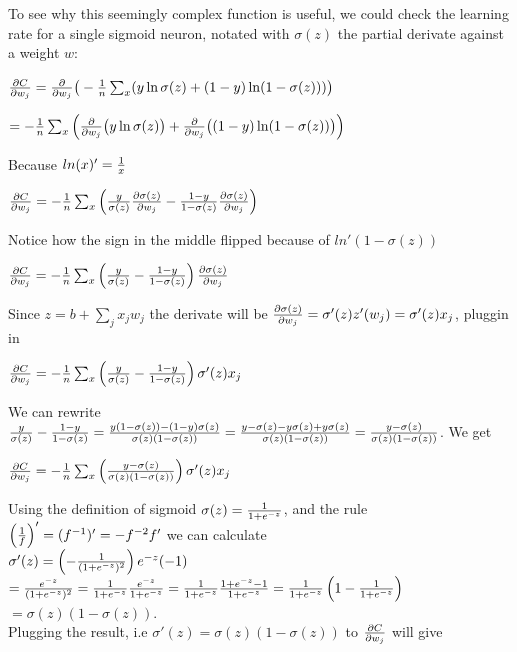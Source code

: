 To see why this seemingly complex function is useful, we could check the learning rate for a single sigmoid neuron, notated with \(\sigma(z)\) the partial derivate against a weight \(w\):

\({\partial C \over \partial w_j} = {\partial \over \partial w_j }{\big ( -{1 \over n}\sum_x(y \ln \sigma(z) + (1 - y) \ln (1-\sigma(z)))\big ) }\)

\(= -{1 \over n}\sum_x \left ( {\partial \over \partial w_j}\big ( y \ln \sigma(z)\big ) + {\partial \over \partial w_j} \big ((1 - y) \ln (1-\sigma(z))\big )\right )\)

Because \(ln(x)' = {1 \over x}\)

\({\partial C \over \partial w_j} = -{1 \over n}\sum_x \left ( {y \over \sigma(z) } {\partial \sigma(z) \over \partial w_j} - {1 - y \over 1-\sigma(z)} {\partial \sigma(z) \over \partial w_j}\right )\)

Notice how the sign in the middle flipped because of \(ln'(1-\sigma(z))\)

\({\partial C \over \partial w_j} = -{1 \over n}\sum_x \left ( {y \over \sigma(z) } - {1 - y \over 1-\sigma(z)}\right ) {\partial \sigma(z) \over \partial w_j} \)

Since \(z = b + \sum_j x_jw_j\) the derivate will be \({\partial \sigma(z) \over \partial w_j} = \sigma'(z) z'(w_j) = \sigma'(z) x_j\), pluggin in

\({\partial C \over \partial w_j} = -{1 \over n}\sum_x \left ( {y \over \sigma(z) } - {1 - y \over 1-\sigma(z)}\right ) \sigma'(z)x_j\)

We can rewrite \({y \over \sigma(z) } - {1 - y \over 1-\sigma(z)} = {y(1-\sigma(z)) - (1 - y)\sigma(z) \over \sigma(z) (1-\sigma(z)) } = {y - \sigma(z) - y\sigma(z) + y\sigma(z) \over \sigma(z) (1-\sigma(z))} = {y - \sigma(z) \over \sigma(z) (1-\sigma(z))}\). We get

\({\partial C \over \partial w_j} = -{1 \over n}\sum_x \left ( {y - \sigma(z) \over \sigma(z) (1-\sigma(z))}\right ) \sigma'(z)x_j\)

Using the definition of sigmoid \(\sigma(z) = {1 \over 1 + e^{-z}}\), and the rule \(\left( 1 \over f \right )' = (f^{-1})' = -f^{-2} f'\) we can calculate\\

\(\sigma'(z) = \left (-{1 \over ( 1 + e^{-z})^2} \right ) e^{-z} (-1)\) \\
\(= {e^{-z} \over ( 1 + e^{-z})^2 } = {1 \over  1 + e^{-z}} {e^{-z} \over 1 + e^{-z}} = {1 \over  1 + e^{-z}} {1 + e^{-z} - 1 \over 1 + e^{-z}} = {1 \over 1 + e^{-z}} \left ( 1 - {1 \over  1 + e^{-z}} \right ) \)\\
\(= \sigma(z)(1 - \sigma(z))\). \\
Plugging the result, i.e \(\sigma'(z) = \sigma(z)(1 - \sigma(z))\) to \({\partial C \over \partial w_j}\) will give

